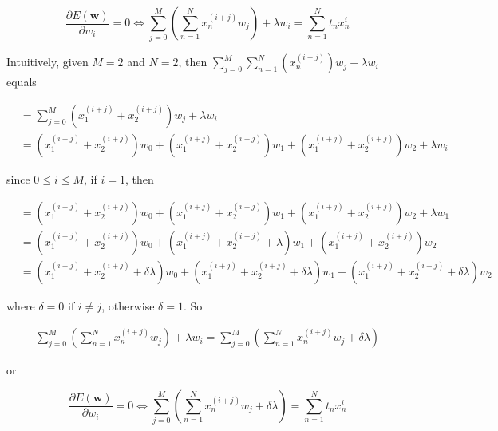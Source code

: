 \begin{equation}
    \frac{\partial E(\pmb{w})}{\partial w_i} = 0 \Leftrightarrow \sum_{j=0}^M (\sum_{n=1}^N x_n^{(i + j)}w_j) + \lambda w_i = \sum_{n=1}^N t_n x_n^i 
\end{equation}

Intuitively, given $M = 2$ and $N = 2$, then $\sum_{j=0}^M \sum_{n=1}^N (x_n^{(i + j)})w_j + \lambda w_i$ equals

\begin{equation}
    \begin{split}
        & = \sum_{j=0}^M (x_1^{(i + j)} + x_2^{(i + j)})w_j + \lambda w_i\\
        & = (x_1^{(i + j)} + x_2^{(i + j)})w_0 + (x_1^{(i + j)} + x_2^{(i + j)})w_1 + (x_1^{(i + j)} + x_2^{(i + j)})w_2 + \lambda w_i
    \end{split}
\end{equation}

since $0 \leq i \leq M$, if $i=1$, then 

\begin{equation}
    \begin{split}
        & = (x_1^{(i + j)} + x_2^{(i + j)})w_0 + (x_1^{(i + j)} + x_2^{(i + j)})w_1 + (x_1^{(i + j)} + x_2^{(i + j)})w_2 + \lambda w_1\\
        & = (x_1^{(i + j)} + x_2^{(i + j)})w_0 + (x_1^{(i + j)} + x_2^{(i + j)} + \lambda)w_1 + (x_1^{(i + j)} + x_2^{(i + j)})w_2\\
        & = (x_1^{(i + j)} + x_2^{(i + j)} + \delta \lambda)w_0 + (x_1^{(i + j)} + x_2^{(i + j)} + \delta \lambda)w_1 + (x_1^{(i + j)} + x_2^{(i + j)} + \delta \lambda)w_2
    \end{split}
\end{equation}

where $\delta = 0$ if $i \neq j$, otherwise $\delta = 1$. So

 \begin{equation}
     \begin{split}
         \sum_{j=0}^M (\sum_{n=1}^N x_n^{(i + j)}w_j) + \lambda w_i = \sum_{j=0}^M (\sum_{n=1}^N x_n^{(i + j)}w_j + \delta \lambda)
     \end{split}
 \end{equation}
 
 or
 
 \begin{equation}
     \frac{\partial E(\pmb{w})}{\partial w_i} = 0 \Leftrightarrow \sum_{j=0}^M (\sum_{n=1}^N x_n^{(i + j)}w_j + \delta \lambda) = \sum_{n=1}^N t_n x_n^i
 \end{equation}
